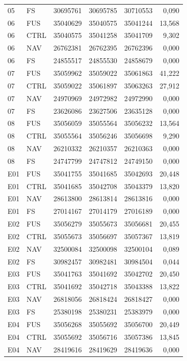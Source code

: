 \begin{singlespace}
\begin{longtable}{@{}llrrrr@{}}
05 & FS & 30695761 & 30695785 & 30710553 & 0{,}090\\
06 & FUS & 35040629 & 35040575 & 35041244 & 13{,}568\\
06 & CTRL & 35040575 & 35041258 & 35041709 & 9{,}302\\
06 & NAV & 26762381 & 26762395 & 26762396 & 0{,}000\\
06 & FS & 24855517 & 24855530 & 24858679 & 0{,}000\\
07 & FUS & 35059962 & 35059022 & 35061863 & 41{,}222\\
07 & CTRL & 35059022 & 35061897 & 35063263 & 27{,}912\\
07 & NAV & 24970969 & 24972982 & 24972990 & 0{,}000\\
07 & FS & 23626086 & 23627506 & 23635128 & 0{,}000\\
08 & FUS & 35056059 & 35055564 & 35056232 & 13{,}564\\
08 & CTRL & 35055564 & 35056246 & 35056698 & 9{,}290\\
08 & NAV & 26210332 & 26210357 & 26210363 & 0{,}000\\
08 & FS & 24747799 & 24747812 & 24749150 & 0{,}000\\
E01 & FUS & 35041755 & 35041685 & 35042693 & 20{,}448\\
E01 & CTRL & 35041685 & 35042708 & 35043379 & 13{,}820\\
E01 & NAV & 28613800 & 28613814 & 28613816 & 0{,}000\\
E01 & FS & 27014167 & 27014179 & 27016189 & 0{,}000\\
E02 & FUS & 35056279 & 35055673 & 35056681 & 20{,}455\\
E02 & CTRL & 35055673 & 35056697 & 35057367 & 13{,}819\\
E02 & NAV & 32500084 & 32500098 & 32500104 & 0{,}089\\
E02 & FS & 30982457 & 30982481 & 30984504 & 0{,}044\\
E03 & FUS & 35041763 & 35041692 & 35042702 & 20{,}450\\
E03 & CTRL & 35041692 & 35042718 & 35043388 & 13{,}822\\
E03 & NAV & 26818056 & 26818424 & 26818427 & 0{,}000\\
E03 & FS & 25380198 & 25380231 & 25383979 & 0{,}000\\
E04 & FUS & 35056268 & 35055692 & 35056700 & 20{,}449\\
E04 & CTRL & 35055692 & 35056716 & 35057386 & 13{,}845\\
E04 & NAV & 28419616 & 28419629 & 28419636 & 0{,}000\\

\end{longtable}
\end{singlespace}

